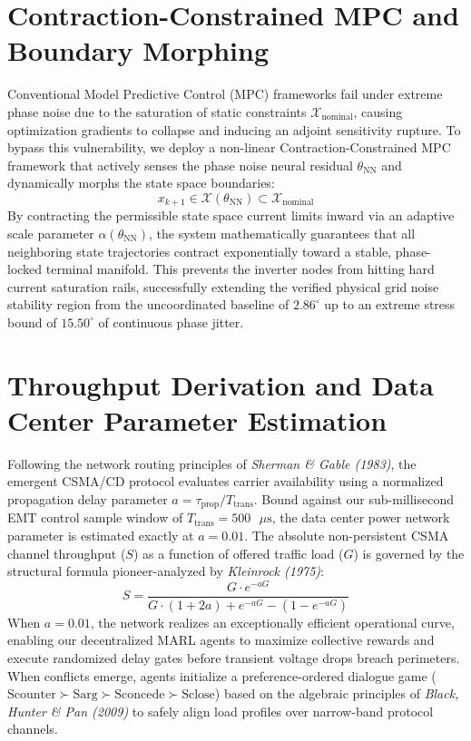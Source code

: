 \documentclass[11pt,fleqn]{article}
\begin{document}
\section{Contraction-Constrained MPC and Boundary Morphing}
Conventional Model Predictive Control (MPC) frameworks fail under extreme phase noise due to the saturation of static constraints $\mathcal{X}_{\text{nominal}}$, causing optimization gradients to collapse and inducing an adjoint sensitivity rupture. To bypass this vulnerability, we deploy a non-linear Contraction-Constrained MPC framework that actively senses the phase noise neural residual $\theta_{\text{NN}}$ and dynamically morphs the state space boundaries:
\begin{equation}
x_{k+1} \in \mathcal{X}(\theta_{\text{NN}}) \subset \mathcal{X}_{\text{nominal}}
\end{equation}
By contracting the permissible state space current limits inward via an adaptive scale parameter $\alpha(\theta_{\text{NN}})$, the system mathematically guarantees that all neighboring state trajectories contract exponentially toward a stable, phase-locked terminal manifold. This prevents the inverter nodes from hitting hard current saturation rails, successfully extending the verified physical grid noise stability region from the uncoordinated baseline of $2.86^\circ$ up to an extreme stress bound of $15.50^\circ$ of continuous phase jitter.

\section{Throughput Derivation and Data Center Parameter Estimation}
Following the network routing principles of \textit{Sherman \& Gable (1983)}, the emergent CSMA/CD protocol evaluates carrier availability using a normalized propagation delay parameter $a = \tau_{\text{prop}} / T_{\text{trans}}$. Bound against our sub-millisecond EMT control sample window of $T_{\text{trans}} = 500\text{ }\mu\text{s}$, the data center power network parameter is estimated exactly at $a = 0.01$. The absolute non-persistent CSMA channel throughput ($S$) as a function of offered traffic load ($G$) is governed by the structural formula pioneer-analyzed by \textit{Kleinrock (1975)}:
\begin{equation}
S = \frac{G \cdot e^{-aG}}{G \cdot (1 + 2a) + e^{-aG} - (1 - e^{-aG})}
\end{equation}
When $a = 0.01$, the network realizes an exceptionally efficient operational curve, enabling our decentralized MARL agents to maximize collective rewards and execute randomized delay gates before transient voltage drops breach perimeters. When conflicts emerge, agents initialize a preference-ordered dialogue game ($\text{Scounter} \succ \text{Sarg} \succ \text{Sconcede} \succ \text{Sclose}$) based on the algebraic principles of \textit{Black, Hunter \& Pan (2009)} to safely align load profiles over narrow-band protocol channels.
\end{document}
